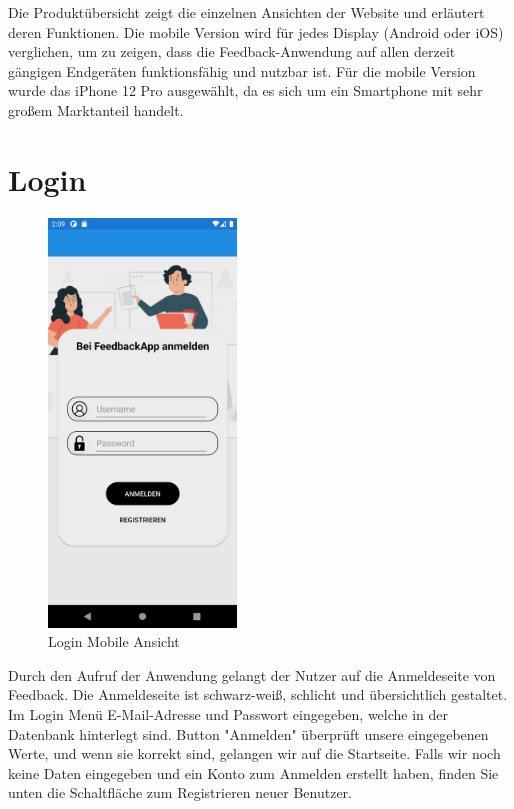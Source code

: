 Die Produktübersicht zeigt die einzelnen Ansichten der Website und erläutert deren 
Funktionen. Die mobile Version wird für jedes Display (Android oder iOS) verglichen, 
um zu zeigen, dass die Feedback-Anwendung auf allen derzeit gängigen Endgeräten 
funktionsfähig und nutzbar ist. Für die mobile Version wurde das iPhone 12 Pro 
ausgewählt, da es sich um ein Smartphone mit sehr großem Marktanteil handelt.
\newpage

\section{Login}
\begin{figure}[h]
    \begin{center}
        \includegraphics*[width=5cm]{pics/Xamarin Student/1 Login Page.png}
        \caption[Login]{Login Mobile Ansicht}
    \end{center}
\end{figure}
Durch den Aufruf der Anwendung gelangt der Nutzer auf die Anmeldeseite 
von Feedback. Die Anmeldeseite ist schwarz-weiß, schlicht und übersichtlich gestaltet.
Im Login Menü E-Mail-Adresse und Passwort eingegeben, welche in 
der Datenbank hinterlegt sind. Button "Anmelden" überprüft unsere 
eingegebenen Werte, und wenn sie korrekt sind, gelangen wir auf die Startseite.
Falls wir noch keine Daten eingegeben und ein Konto zum Anmelden erstellt haben, 
finden Sie unten die Schaltfläche zum Registrieren neuer Benutzer.
\newpage

